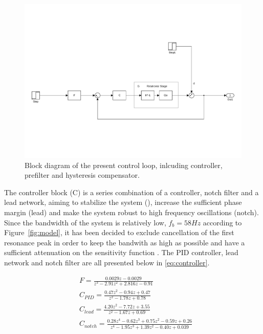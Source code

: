 \begin{figure}[h]
  \centering %
  \includegraphics[width=1\textwidth, trim=4cm 3cm 2.1cm 10cm, clip=true]{fig/matlab/present_controller}
  \caption{\label{fig:present}Block diagram of the present control loop, inlcuding controller, prefilter and hysteresis compensator.}
\end{figure}

The controller block (C) is a series combination of a \abbrPID controller, notch filter and a lead network, aiming to stabilize the system (\abbrPID), increase the sufficient phase margin (lead) and make the system robust to high frequency oscillations (notch). Since the bandwidth of the system is relatively low, $f_b = 58 Hz$ according to  Figure~\ref{fig:model}, it has been decided to exclude cancellation of the first resonance peak in order to keep the bandwith as high as possible and have a sufficient attenuation on the sensitivity function \citep{ButcherController:2015}. The PID controller, lead network and notch filter are all presented below in \eqref{eq:controller}.

\begin{subequations}
  \label{eq:controller}
\begin{alignat}{2}
  \label{eq:pre}
  & F = \frac{0.0029z - 0.0029}{z^3 - 2.91z^2 + 2.816 z - 0.91} \\
  \label{eq:pid}
  & C_{PID} = \frac{0.47z^2 - 0.94z + 0.47}{z^2 - 1.78 z + 0.78} \\
  \label{eq:lead}
  & C_{lead} = \frac{4.20 z^2 - 7.72z + 3.55}{z^2 - 1.67z + 0.69} \\
  \label{eq:notch}
  & C_{notch} = \frac{0.28z^4 - 0.62z^3 + 0.75z^2 - 0.59z + 0.26}{z^4 - 1.95z^3 + 1.39z^2 - 0.40z + 0.039}
\end{alignat}
\end{subequations}
